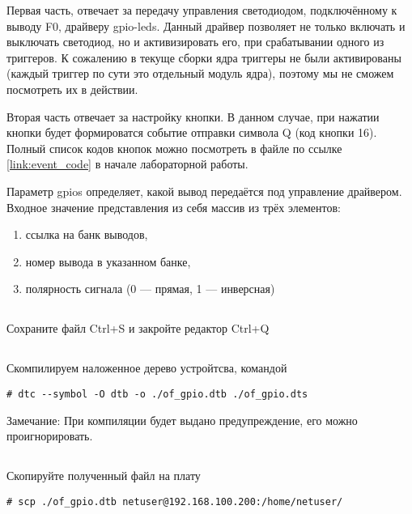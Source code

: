 Первая часть, отвечает за передачу управления светодиодом, подключённому к выводу F0, драйверу gpio-leds. Данный драйвер позволяет не только включать и выключать светодиод, но и активизировать его, при срабатывании одного из триггеров. К сожалению в текуще сборки ядра триггеры не были активированы (каждый триггер по сути это отдельный модуль ядра), поэтому мы не сможем посмотреть их в действии.

Вторая часть отвечает за настройку кнопки. В данном случае, при нажатии кнопки будет формироватся событие отправки символа Q (код кнопки 16). Полный список кодов кнопок можно посмотреть в файле по ссылке \ref{link:event_code} в начале лабораторной работы.

Параметр gpios определяет, какой вывод передаётся под управление драйвером. Входное значение представления из себя массив из трёх элементов:
\begin{enumerate}
	\item ссылка на банк выводов,
	\item номер вывода в указанном банке,
	\item полярность сигнала (0 — прямая, 1 — инверсная)
\end{enumerate}

\subsection{}Сохраните файл Ctrl+S и закройте редактор Ctrl+Q

\subsection{}Скомпилируем наложенное дерево устройтсва, командой \label{lab_gpio:dts_compile}
\begin{lstlisting}[style=bash]
# dtc --symbol -O dtb -o ./of_gpio.dtb ./of_gpio.dts
\end{lstlisting}
\begin{Notes}{Замечание:}
	При компиляции будет выдано предупреждение, его можно проигнорировать.
\end{Notes}

\subsection{}Скопируйте полученный файл на плату
\begin{lstlisting}[style=bash]
# scp ./of_gpio.dtb netuser@192.168.100.200:/home/netuser/
\end{lstlisting}


